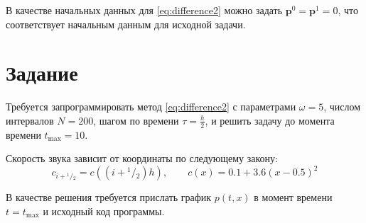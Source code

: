 \documentclass[12pt]{article}
\newcommand{\cutefrac}[2]{{}^{#1\!}\!/{\!}_#2}
\newcommand{\half}{\cutefrac{1}{2}}
\begin{document}
В качестве начальных данных для \eqref{eq:difference2} можно задать
$\mathbf{p}^0 = \mathbf{p}^1 = 0$, что соответствует начальным данным для
исходной задачи. 

\section{Задание}
Требуется запрограммировать метод \eqref{eq:difference2} с параметрами 
$\omega = 5$, числом интервалов $N = 200$, шагом по времени $\tau = \frac{h}{2}$, и решить задачу до момента времени $t_{\max} = 10$. 

Скорость звука зависит от координаты по следующему закону:
\[
c_{i+\half} = c\left( (i + \half) h\right), \qquad c(x) = 0.1 + 3.6 (x - 0.5)^2
\]

В качестве решения требуется прислать график $p(t, x)$ в момент времени $t = t_{\max}$ и исходный код программы.
\end{document}
